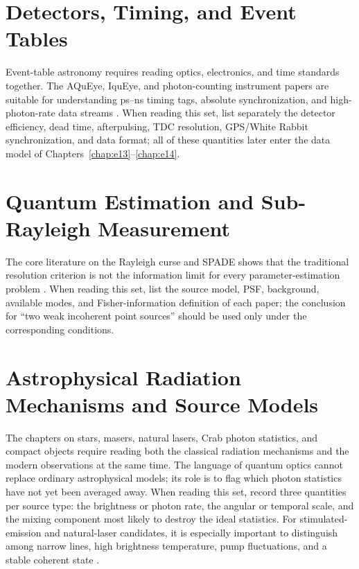 \section{Detectors, Timing, and Event Tables}
\label{appsec:g-instrument}

Event-table astronomy requires reading optics, electronics, and time standards together. The AQuEye, IquEye, and photon-counting instrument papers are suitable for understanding ps--ns timing tags, absolute synchronization, and high-photon-rate data streams \citep{2015SPIE.9504E..0CZ,2016SPIE.9907E..0NZ,2013NIMPA.725..187J,2020RScI...91a3108W}. When reading this set, list separately the detector efficiency, dead time, afterpulsing, TDC resolution, GPS/White Rabbit synchronization, and data format; all of these quantities later enter the data model of Chapters~\ref{chap:e13}--\ref{chap:e14}.

\section{Quantum Estimation and Sub-Rayleigh Measurement}
\label{appsec:g-estimation}

The core literature on the Rayleigh curse and SPADE shows that the traditional resolution criterion is not the information limit for every parameter-estimation problem \citep{2015Optic...2..646T,2016PhRvX...6c1033T,2017PhRvL.118g0801T,2017NJPh...19b3054T}. When reading this set, list the source model, PSF, background, available modes, and Fisher-information definition of each paper; the conclusion for ``two weak incoherent point sources'' should be used only under the corresponding conditions.

\section{Astrophysical Radiation Mechanisms and Source Models}
\label{appsec:g-sources}

The chapters on stars, masers, natural lasers, Crab photon statistics, and compact objects require reading both the classical radiation mechanisms and the modern observations at the same time. The language of quantum optics cannot replace ordinary astrophysical models; its role is to flag which photon statistics have not yet been averaged away. When reading this set, record three quantities per source type: the brightness or photon rate, the angular or temporal scale, and the mixing component most likely to destroy the ideal statistics. For stimulated-emission and natural-laser candidates, it is especially important to distinguish among narrow lines, high brightness temperature, pump fluctuations, and a stable coherent state \citep{1982RvMP...54.1225E,1992ARA&A..30...75E,2004A&A...428..497J,2005MNRAS.364..731J,2005NewA...10..361J,2008AIPC..984..216D}.

